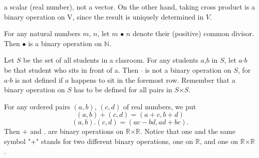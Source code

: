\documentclass[11pt]{amsbook}
\begin{document}
	a scalar (real number), not a vector. On the other hand, taking cross product is
	a binary operation on V, since the result is uniquely determined in $V$. \\

	
	\begin{hEnumerateAlpha}
		\item For any natural numbers $m$, $n$, let $m$ $\bullet$ $n$ denote their 
		(positive) common divisor. Then $\bullet$ is a binary operation on $\mathbb{N}$. \\

		\item Let $S$ be the set of all students in a clasroom. For any students $a$,$b$ in $S$,
		let $a$$\cdot$$b$ be that student who sits in front of a. Then $\cdot$ is not a binary 
		operation on $S$, for $a$$\cdot$$b$  is not defined if $a$ happens to sit in the 
		foremost row. Remember that a binary operation on $S$ has to be defined for all pairs 
		in $S$$\times$$S$. \\

		\item For any ordered pairs $(a,b)$, $(c,d)$ of real numbers, we put 
		$$ (a,b)+(c,d) = (a+c, b+d)$$
		$$ (a,b).(c,d) = (ac-bd, ad+bc).$$
		Then $+$ and $.$ are binary operations on $\mathbb{R}$$\times$$\mathbb{R}$.
		Notice that one and the same symbol "+" stands for two different binary operations, 
		one on $\mathbb{R}$, and one on $\mathbb{R}$$\times$$\mathbb{R}$. \\ 
		
 
	\end{hEnumerateAlpha}	
    		
\end{document}
